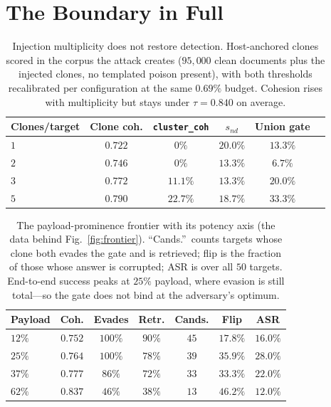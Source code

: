 \documentclass[10pt,journal,compsoc]{IEEEtran}
\begin{document}
\section{The Boundary in Full}
\label{app:boundaryfull}

\begin{table}[t]
\centering
\caption{Injection multiplicity does not restore detection. Host-anchored clones scored in the
corpus the attack creates ($95{,}000$ clean documents plus the injected clones, no templated
poison present), with both thresholds recalibrated per configuration at the same $0.69\%$
budget. Cohesion rises with multiplicity but stays under $\tau=0.840$ on average.}
\label{tab:multiplicity}
\begin{tabular}{lccccc}
\toprule
Clones/target & Clone coh. & \texttt{cluster\_coh} & $s_{nd}$ & Union gate \\
\midrule
$1$ & $0.722$ & $0\%$    & $20.0\%$ & $13.3\%$ \\
$2$ & $0.746$ & $0\%$    & $13.3\%$ & $6.7\%$  \\
$3$ & $0.772$ & $11.1\%$ & $13.3\%$ & $20.0\%$ \\
$5$ & $0.790$ & $22.7\%$ & $18.7\%$ & $33.3\%$ \\
\bottomrule
\end{tabular}
\end{table}

\begin{table}[t]
\centering
\caption{The payload-prominence frontier with its potency axis (the data behind
Fig.~\ref{fig:frontier}). ``Cands.''\ counts targets whose clone both evades the gate and is
retrieved; flip is the fraction of those whose answer is corrupted; ASR is over all $50$
targets. End-to-end success peaks at $25\%$ payload, where evasion is still total---so the gate
does not bind at the adversary's optimum.}
\label{tab:frontier}
\begin{tabular}{lcccccc}
\toprule
Payload & Coh. & Evades & Retr. & Cands. & Flip & ASR \\
\midrule
$12\%$ & $0.752$ & $100\%$ & $90\%$ & $45$ & $17.8\%$ & $16.0\%$ \\
$25\%$ & $0.764$ & $100\%$ & $78\%$ & $39$ & $35.9\%$ & $\mathbf{28.0\%}$ \\
$37\%$ & $0.777$ & $86\%$  & $72\%$ & $33$ & $33.3\%$ & $22.0\%$ \\
$62\%$ & $0.837$ & $46\%$  & $38\%$ & $13$ & $46.2\%$ & $12.0\%$ \\
\bottomrule
\end{tabular}
\end{table}
\end{document}
